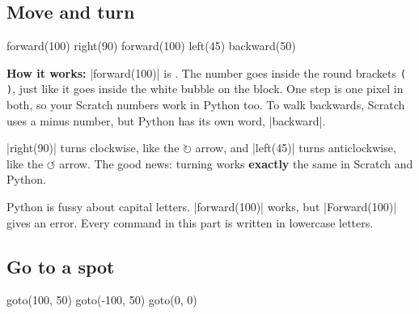\subsection*{Move and turn}

\begin{tcbraster}[raster columns=2, raster equal height=rows, raster column skip=12pt, raster valign=center]
\begin{tcolorbox}[colback=white, colframe=white, boxrule=0pt, valign=center]
\begin{scratch}
\end{scratch}
\end{tcolorbox}
\begin{code}
forward(100)
right(90)
forward(100)
left(45)
backward(50)
\end{code}
\end{tcbraster}

\textbf{How it works:} \py|forward(100)| is . The number goes inside the round brackets \texttt{( )}, just like it goes inside the white bubble on the block. One step is one pixel in both, so your Scratch numbers work in Python too. To walk backwards, Scratch uses a minus number, but Python has its own word, \py|backward|.

\py|right(90)| turns clockwise, like the $\circlearrowright$ arrow, and \py|left(45)| turns anticlockwise, like the $\circlearrowleft$ arrow. The good news: turning works \textbf{exactly} the same in Scratch and Python.

\begin{watchout}
Python is fussy about capital letters. \py|forward(100)| works, but \py|Forward(100)| gives an error. Every command in this part is written in lowercase letters.
\end{watchout}

\subsection*{Go to a spot}

\begin{tcbraster}[raster columns=2, raster equal height=rows, raster column skip=12pt, raster valign=center]
\begin{tcolorbox}[colback=white, colframe=white, boxrule=0pt, valign=center]
\begin{scratch}
\end{scratch}
\end{tcolorbox}
\begin{code}
goto(100, 50)
goto(-100, 50)
goto(0, 0)
\end{code}
\end{tcbraster}

